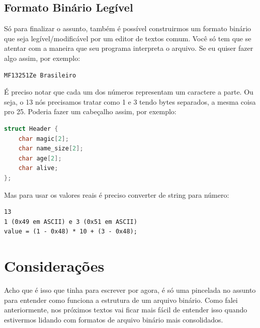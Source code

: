 \documentclass[a4paper,oneside,12pt]{article}
\begin{document}
\subsection{Formato Binário Legível}

Só para finalizar o assunto, também é possível construirmos um formato binário que seja legível/modificável por um editor de textos comum. Você só tem que se atentar com a maneira que seu programa interpreta o arquivo. Se eu quiser fazer algo assim, por exemplo:

\begin{lstlisting}
MF13251Ze Brasileiro
\end{lstlisting}

É preciso notar que cada um dos números representam um caractere a parte. Ou seja, o 13 nós precisamos tratar como 1 e 3 tendo bytes separados, a mesma coisa pro 25. Poderia fazer um cabeçalho assim, por exemplo:

\begin{lstlisting}[language=C]
struct Header {
    char magic[2];
    char name_size[2];
    char age[2];
    char alive;
};
\end{lstlisting}

Mas para usar os valores reais é preciso converter de string para número:

\begin{lstlisting}
13
1 (0x49 em ASCII) e 3 (0x51 em ASCII)
value = (1 - 0x48) * 10 + (3 - 0x48);
\end{lstlisting}

\section{Considerações}

Acho que é isso que tinha para escrever por agora, é só uma pincelada no assunto para entender como funciona a estrutura de um arquivo binário. Como falei anteriormente, nos próximos textos vai ficar mais fácil de entender isso quando estivermos lidando com formatos de arquivo binário mais consolidados.
\end{document}
